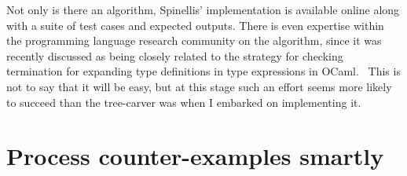 Not only is there an algorithm, Spinellis' implementation is available
online
along with a suite of test
cases
and expected
outputs.
There is even expertise within the programming language research community on
the algorithm, since it was recently discussed as being closely related to the
strategy for checking termination for expanding type definitions in type
expressions in OCaml.~ This is not to say that it
will be easy, but at this stage such an effort seems more likely to succeed
than the tree-carver was when I embarked on implementing it.

\section{Process counter-examples smartly}\label{sec:counter-ex}

